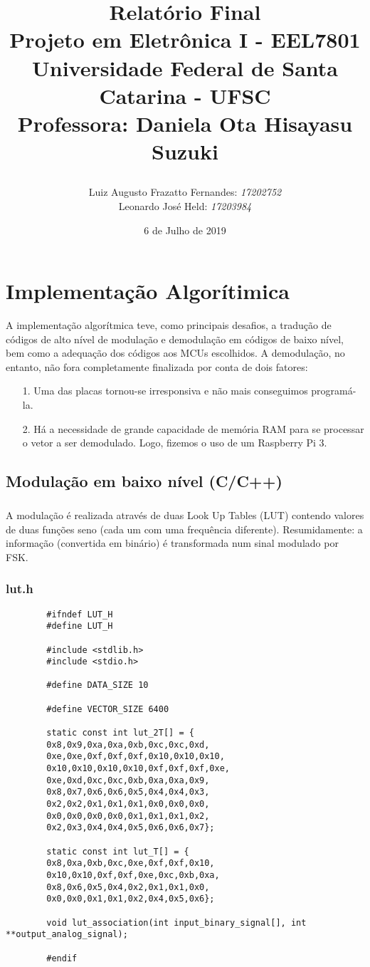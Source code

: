 \documentclass[11pt,a4paper]{report}
\title{Relatório Final  \\
	Projeto em Eletrônica I - EEL7801 \\ \vfill
	\normalsize{Universidade Federal de Santa Catarina - UFSC \\
		Professora: Daniela Ota Hisayasu Suzuki}
	\author{
		{Luiz Augusto Frazatto Fernandes: \it{17202752}} \\
		{Leonardo José Held: \it{17203984}}
}
}
\date{6 de Julho de 2019}
\begin{document}
	\maketitle
	\setcounter{chapter}{0}

	
	\chapter{Implementação Algorítimica}
		A implementação algorítmica teve, como principais desafios, a tradução de códigos de alto nível de modulação e demodulação em códigos de baixo nível, bem como a adequação dos códigos aos MCUs escolhidos. A demodulação, no entanto, não fora completamente finalizada por conta de dois fatores:
		\begin{itemize}
			\item[1.] Uma das placas tornou-se irresponsiva e não mais conseguimos programá-la.
			\item[2.] Há a necessidade de grande capacidade de memória RAM para se processar o vetor a ser demodulado. Logo, fizemos o uso de um Raspberry Pi 3.
		\end{itemize}
		
	\section{Modulação em baixo nível (C/C++)}
	\paragraph{}
		A modulação é realizada através de duas Look Up Tables (LUT) contendo valores de duas funções seno (cada um com uma frequência diferente). Resumidamente: a informação (convertida em binário) é transformada num sinal modulado por FSK.
	\subsection{lut.h}
		\begin{verbatim}
		#ifndef LUT_H
		#define LUT_H
		
		#include <stdlib.h>
		#include <stdio.h>
		
		#define DATA_SIZE 10
		
		#define VECTOR_SIZE 6400
		
		static const int lut_2T[] = {
		0x8,0x9,0xa,0xa,0xb,0xc,0xc,0xd,
		0xe,0xe,0xf,0xf,0xf,0x10,0x10,0x10,
		0x10,0x10,0x10,0x10,0xf,0xf,0xf,0xe,
		0xe,0xd,0xc,0xc,0xb,0xa,0xa,0x9,
		0x8,0x7,0x6,0x6,0x5,0x4,0x4,0x3,
		0x2,0x2,0x1,0x1,0x1,0x0,0x0,0x0,
		0x0,0x0,0x0,0x0,0x1,0x1,0x1,0x2,
		0x2,0x3,0x4,0x4,0x5,0x6,0x6,0x7};
		
		static const int lut_T[] = {
		0x8,0xa,0xb,0xc,0xe,0xf,0xf,0x10,
		0x10,0x10,0xf,0xf,0xe,0xc,0xb,0xa,
		0x8,0x6,0x5,0x4,0x2,0x1,0x1,0x0,
		0x0,0x0,0x1,0x1,0x2,0x4,0x5,0x6};
		
		void lut_association(int input_binary_signal[], int **output_analog_signal);
		
		#endif
		\end{verbatim}
		
\end{document}
